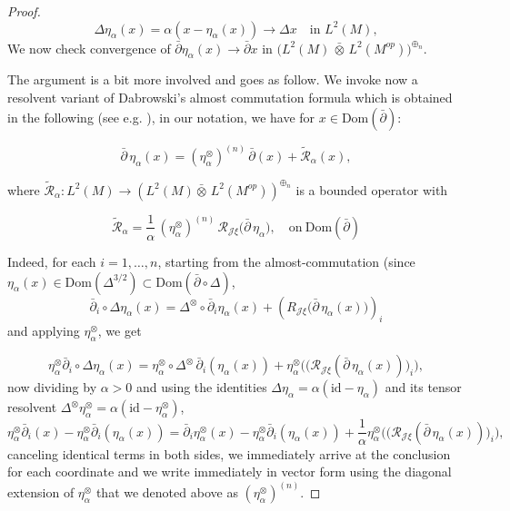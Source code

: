 \documentclass[10pt,a4paper,reqno]{amsart}
\newcommand{\Dom}{\mathrm{Dom}}
\begin{document}
\begin{proof}
\[
\Delta \eta_\alpha(x)
=
\alpha(x-\eta_\alpha(x))
\longrightarrow
\Delta x
\quad\text{in }L^2(M),
\]
\bigbreak
We now check convergence of $\bar\partial \eta_\alpha(x)\to \bar\partial x$
in $\big(L^2(M)\,\bar\otimes\,L^2(M^{op})\big)^{\oplus_n}$. 

The argument is a bit more involved and goes as follow. We invoke now a resolvent variant of Dabrowski's almost commutation formula which is  obtained in the following (see e.g. \cite[Lemma~2]{Dab14}), in our notation, we have for $x\in \Dom(\bar\partial)$:


\[
\bar\partial\,\eta_\alpha(x)
=
(\eta_\alpha^{\otimes})^{(n)}\,\bar\partial (x)
+
\tilde{\mathcal R}_\alpha(x),
\]


where $\tilde{\mathcal R}_\alpha: L^2(M)\to (L^2(M){\bar\otimes}\,L^2(M^{op}))^{\oplus_n}$ is a bounded operator with 


\[
\tilde{\mathcal R}_\alpha
=
\frac{1}{\alpha}\,(\eta_\alpha^{\otimes})^{(n)}\,\mathcal R_{\mathscr J\xi}\big(\bar\partial\,\eta_\alpha\big), \quad\text{on}\: \Dom(\bar\partial)
\]

Indeed, for each $i=1,\ldots,n$, starting from the almost-commutation (since $\eta_{\alpha}(x)\in \Dom(\Delta^{3/2})\subset \Dom(\bar\partial \circ \Delta)$,
\[
\bar\partial_i\circ\Delta \eta_{\alpha}(x)
=
\Delta^{\otimes}\circ\bar\partial_i\eta_{\alpha}(x)
+(R_{\mathscr J\xi}\big(\bar\partial\,\eta_\alpha(x)\big))_i
\]
and applying $\eta_{\alpha}^{\otimes}$, we get

\[
\eta_\alpha^{\otimes}\bar\partial_i\circ \Delta \eta_\alpha(x)
=
\eta_\alpha^{\otimes}\circ \Delta^{\otimes}\,\bar\partial_i(\eta_{\alpha}(x))
+\eta_\alpha^{\otimes}\big(\big(\mathcal R_{\mathscr J\xi}(\bar\partial\,\eta_\alpha(x))\big)_i\big),
\]
now dividing by $\alpha>0$ and using the identities $\Delta\eta_\alpha=\alpha(\mathrm{id}-\eta_{\alpha})$ and its tensor resolvent $\Delta^{\otimes}\eta_\alpha^{\otimes}=\alpha(\mathrm{id}-\eta_{\alpha}^{\otimes})$,
\[
\eta_\alpha^{\otimes}\bar\partial_i(x)-\eta_\alpha^{\otimes}\bar\partial_i(\eta_\alpha(x))
=
\bar\partial_i\eta_\alpha^{\otimes}(x)-\eta_\alpha^{\otimes}\bar\partial_i(\eta_\alpha(x))
+\frac{1}{\alpha}\eta_\alpha^{\otimes}\big(\big(\mathcal R_{\mathscr J\xi}(\bar\partial\,\eta_\alpha(x))\big)_i\big),
\]
canceling identical terms in both sides, we immediately arrive at the conclusion for each coordinate and we write immediately in vector form using the diagonal extension of $\eta_\alpha^{\otimes}$ that we denoted above as $(\eta_\alpha^{\otimes})^{(n)}$.


\end{proof}
\end{document}
